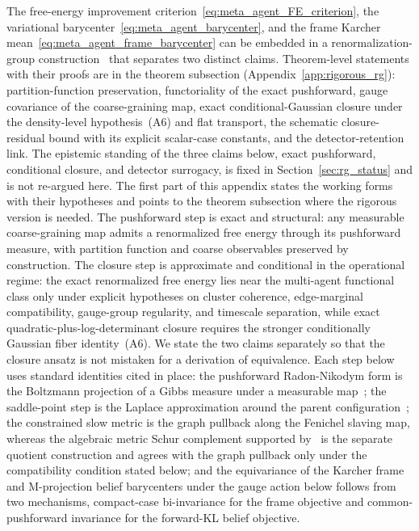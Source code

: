 \documentclass[11pt]{article}
\begin{document}
The free-energy improvement criterion~\eqref{eq:meta_agent_FE_criterion}, the variational barycenter~\eqref{eq:meta_agent_barycenter}, and the frame Karcher mean~\eqref{eq:meta_agent_frame_barycenter} can be embedded in a renormalization-group construction~\cite{Wilson1971, Cardy1996} that separates two distinct claims. Theorem-level statements with their proofs are in the theorem subsection (Appendix~\ref{app:rigorous_rg}): partition-function preservation, functoriality of the exact pushforward, gauge covariance of the coarse-graining map, exact conditional-Gaussian closure under the density-level hypothesis~(A6) and flat transport, the schematic closure-residual bound with its explicit scalar-case constants, and the detector-retention link. The epistemic standing of the three claims below, exact pushforward, conditional closure, and detector surrogacy, is fixed in Section~\ref{sec:rg_status} and is not re-argued here. The first part of this appendix states the working forms with their hypotheses and points to the theorem subsection where the rigorous version is needed. The pushforward step is exact and structural: any measurable coarse-graining map admits a renormalized free energy through its pushforward measure, with partition function and coarse observables preserved by construction. The closure step is approximate and conditional in the operational regime: the exact renormalized free energy lies near the multi-agent functional class only under explicit hypotheses on cluster coherence, edge-marginal compatibility, gauge-group regularity, and timescale separation, while exact quadratic-plus-log-determinant closure requires the stronger conditionally Gaussian fiber identity~(A6). We state the two claims separately so that the closure ansatz is not mistaken for a derivation of equivalence. Each step below uses standard identities cited in place: the pushforward Radon-Nikodym form is the Boltzmann projection of a Gibbs measure under a measurable map~\cite{Cardy1996}; the saddle-point step is the Laplace approximation around the parent configuration~\cite{Cardy1996}; the constrained slow metric is the graph pullback along the Fenichel slaving map, whereas the algebraic metric Schur complement supported by~\cite{HornJohnson2013} is the separate quotient construction and agrees with the graph pullback only under the compatibility condition stated below; and the equivariance of the Karcher frame and M-projection belief barycenters under the gauge action below follows from two mechanisms, compact-case bi-invariance for the frame objective and common-pushforward invariance for the forward-KL belief objective.
\end{document}
